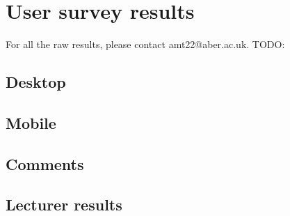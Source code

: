 \chapter{User survey results}
\label{appendix:user-results}
For all the raw results, please contact amt22@aber.ac.uk.
TODO:
\section{Desktop}
\section{Mobile}
\section{Comments} 
\section{Lecturer results}